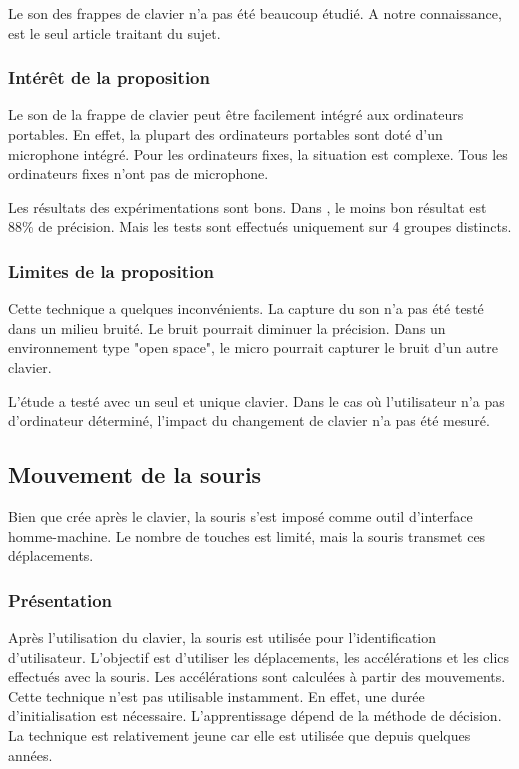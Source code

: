 \documentclass[conference,compsoc]{IEEEtran}
\begin{document}
Le son des frappes de clavier n'a pas été beaucoup étudié. A notre connaissance, \cite{7477360} est le seul article traitant du sujet.

\subsubsection{Intérêt de la proposition}
Le son de la frappe de clavier peut être facilement intégré aux ordinateurs portables. En effet, la plupart des ordinateurs portables sont doté d'un microphone intégré. Pour les ordinateurs fixes, la situation est complexe. Tous les ordinateurs fixes n'ont pas de microphone.

Les résultats des expérimentations sont bons. Dans \cite{7477360}, le moins bon résultat est 88\% de précision. Mais les tests sont effectués uniquement sur 4 groupes distincts.

\subsubsection{Limites de la proposition}
Cette technique a quelques inconvénients. La capture du son n'a pas été testé dans un milieu bruité. Le bruit pourrait diminuer la précision. Dans un environnement type "open space", le micro pourrait capturer le bruit d'un autre clavier.

L'étude \cite{7477360} a testé avec un seul et unique clavier. Dans le cas où l'utilisateur n'a pas d'ordinateur déterminé, l'impact du changement de clavier n'a pas été mesuré.

\subsection{Mouvement de la souris} %
Bien que crée après le clavier, la souris s'est imposé comme outil d'interface homme-machine. Le nombre de touches est limité, mais la souris transmet ces déplacements.

\subsubsection{Présentation}
Après l'utilisation du clavier, la souris est utilisée pour l'identification d'utilisateur. L'objectif est d'utiliser les déplacements, les accélérations et les clics effectués avec la souris.
Les accélérations sont calculées à partir des mouvements. Cette technique n'est pas utilisable instamment. En effet, une durée d'initialisation est nécessaire. L'apprentissage dépend de la méthode de décision.
La technique est relativement jeune car elle est utilisée que depuis quelques années.
\end{document}

